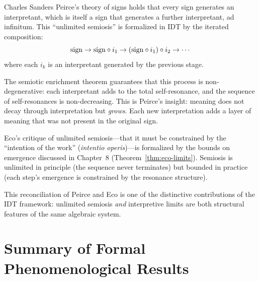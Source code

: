 \begin{interpretation}
\label{interp:peirce-semiosis}
Charles Sanders Peirce's theory of signs holds that every sign generates
an interpretant, which is itself a sign that generates a further interpretant,
ad infinitum.  This ``unlimited semiosis'' is formalized in IDT by the
iterated composition:
\[
\mathrm{sign} \to \mathrm{sign} \circ i_1 \to (\mathrm{sign} \circ i_1) \circ i_2 \to \cdots
\]
where each $i_k$ is an interpretant generated by the previous stage.

The semiotic enrichment theorem guarantees that this process is non-degenerative:
each interpretant adds to the total self-resonance, and the sequence of
self-resonances is non-decreasing.  This is Peirce's insight: meaning does
not decay through interpretation but \emph{grows}.  Each new interpretation
adds a layer of meaning that was not present in the original sign.

Eco's critique of unlimited semiosis---that it must be constrained by the
``intention of the work'' (\textit{intentio operis})---is formalized by
the bounds on emergence discussed in Chapter~8
(Theorem~\ref{thm:eco-limits}).  Semiosis is unlimited in principle
(the sequence never terminates) but bounded in practice (each step's
emergence is constrained by the resonance structure).

This reconciliation of Peirce and Eco is one of the distinctive contributions
of the IDT framework: unlimited semiosis \emph{and} interpretive limits are
both structural features of the same algebraic system.
\end{interpretation}

\section{Summary of Formal Phenomenological Results}

